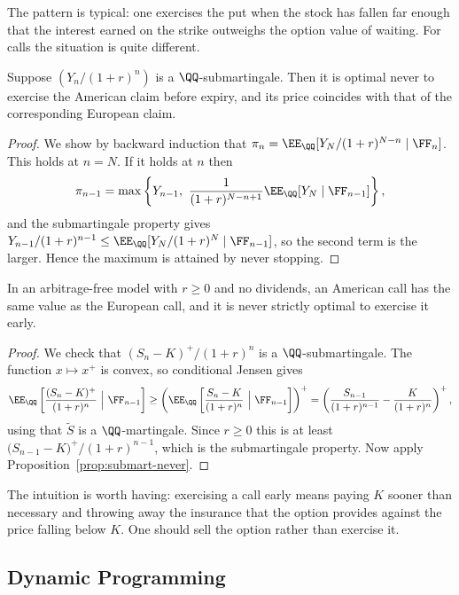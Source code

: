 The pattern is typical: one exercises the put when the stock has fallen far enough that the interest earned on the strike outweighs the option value of waiting. For calls the situation is quite different.

\begin{proposition}\label{prop:submart-never}
	Suppose $(Y_n/(1+r)^n)$ is a $\QQ$-submartingale. Then it is optimal never to exercise the American claim before expiry, and its price coincides with that of the corresponding European claim.
\end{proposition}

\begin{proof}
	We show by backward induction that $\pi_n = \EE_\QQ[Y_N/(1+r)^{N-n}\mid\FF_n]$. This holds at $n = N$. If it holds at $n$ then
	$$
	\pi_{n-1} = \max\left\{Y_{n-1},\ \frac{1}{(1+r)^{N-n+1}}\EE_\QQ[Y_N\mid\FF_{n-1}]\right\},
	$$
	and the submartingale property gives $Y_{n-1}/(1+r)^{n-1}\leq \EE_\QQ[Y_N/(1+r)^N\mid\FF_{n-1}]$, so the second term is the larger. Hence the maximum is attained by never stopping.
\end{proof}

\begin{corollary}
	In an arbitrage-free model with $r \geq 0$ and no dividends, an American call has the same value as the European call, and it is never strictly optimal to exercise it early.
\end{corollary}

\begin{proof}
	We check that $(S_n - K)^+/(1+r)^n$ is a $\QQ$-submartingale. The function $x \mapsto x^+$ is convex, so conditional Jensen gives
	$$
	\EE_\QQ\left[\frac{(S_n-K)^+}{(1+r)^n}\ \Big|\ \FF_{n-1}\right] \geq \left(\EE_\QQ\left[\frac{S_n - K}{(1+r)^n}\ \Big|\ \FF_{n-1}\right]\right)^+ = \left(\frac{S_{n-1}}{(1+r)^{n-1}} - \frac{K}{(1+r)^n}\right)^+,
	$$
	using that $\tilde S$ is a $\QQ$-martingale. Since $r\geq 0$ this is at least $\big(S_{n-1}-K\big)^+/(1+r)^{n-1}$, which is the submartingale property. Now apply Proposition~\ref{prop:submart-never}.
\end{proof}

The intuition is worth having: exercising a call early means paying $K$ sooner than necessary and throwing away the insurance that the option provides against the price falling below $K$. One should sell the option rather than exercise it.

\subsection{Dynamic Programming}

